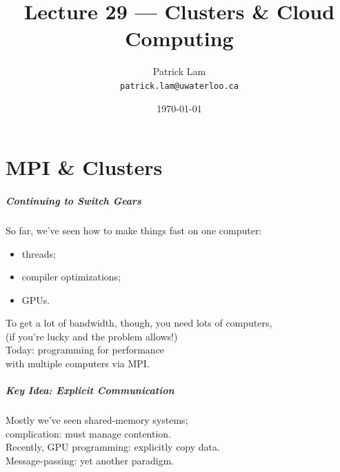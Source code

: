 

\title{Lecture 29 --- Clusters \& Cloud Computing}

\author{Patrick Lam \\ \small \texttt{patrick.lam@uwaterloo.ca}}
\date{\today}




\begin{frame}
  \titlepage

 \end{frame}


\part{MPI \& Clusters}
\frame{\partpage}


\begin{frame}
  \frametitle{Continuing to Switch Gears}

  

  So far, we've seen how to make things fast on one computer:
\begin{itemize}
\item threads;
\item compiler optimizations;
\item GPUs.
\end{itemize}
  To get a lot of bandwidth, though, you need lots of computers, \\
   \qquad (if you're lucky and the problem allows!)\\[1em]

  Today: programming for performance \\ \qquad with multiple computers via MPI.

  
\end{frame}

\begin{frame}
  \frametitle{Key Idea: Explicit Communication}

  
  Mostly we've seen shared-memory systems;\\
  \qquad complication: must manage contention.\\[1em]

  Recently, GPU programming: explicitly copy data.\\[1em]

  Message-passing: yet another paradigm.

  
\end{frame}

